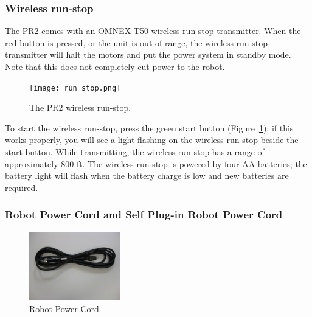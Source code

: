 \subsubsection{Wireless run-stop}
\label{wirelessrunstop}
The PR2 comes with an
\href{http://www.omnexcontrols.com/products/portable/t50.html}{OMNEX T50}
wireless run-stop transmitter. When the red button is pressed, or the unit is
out of range, the wireless run-stop transmitter will halt the motors and put the
power system in standby mode. Note that this does not completely cut power to the robot.

\begin{figure}[h!]
\centering
\texttt{[image: run\_stop.png]}
\caption{The PR2 wireless run-stop.}
\label{fig:wirelessrunstop}
\end{figure}

To start the wireless run-stop, press the green start button (Figure~\ref{fig:wirelessrunstop});
if this works properly, you will see a light flashing on the wireless run-stop beside the start button. While
transmitting, the wireless run-stop has a range of approximately 800 ft. The wireless run-stop is
powered by four AA batteries; the battery light will flash when the battery
charge is low and new batteries are required.

\subsubsection{Robot Power Cord and Self Plug-in Robot Power Cord}
\begin{figure}[h!]
\centering
\includegraphics[width=150px]{images/long_plug.png}
\caption{Robot Power Cord}
\label{fig:longcord}
\end{figure}
\label{longcord}

